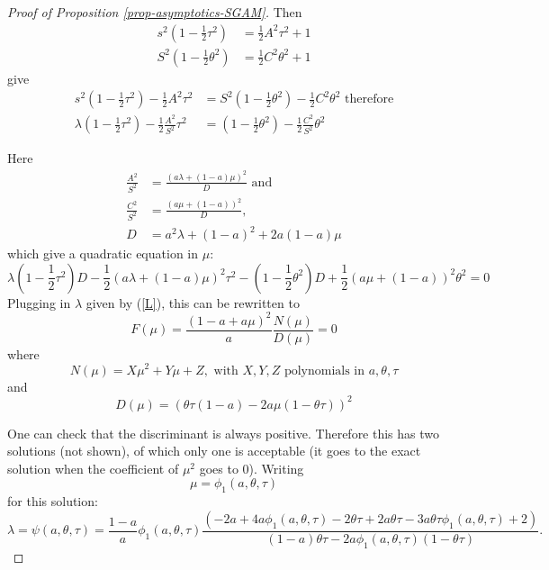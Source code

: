 \documentclass[
]{article}
\theoremstyle{definition}
\theoremstyle{definition}
\theoremstyle{definition}
\theoremstyle{definition}
\theoremstyle{remark}
\begin{document}
\begin{proof}[Proof of Proposition \ref{prop-asymptotics-SGAM}]
Then
\begin{align*}
s^{2}\left(1-\frac{1}{2}\tau^{2}\right) & =\frac{1}{2}A^{2}\tau^{2}+1\\
S^{2}\left(1-\frac{1}{2}\theta^{2}\right) & =\frac{1}{2}C^{2}\theta^{2}+1
\end{align*}
give
\begin{align*}
s^{2}\left(1-\frac{1}{2}\tau^{2}\right)-\frac{1}{2}A^{2}\tau^{2} & =S^{2}\left(1-\frac{1}{2}\theta^{2}\right)-\frac{1}{2}C^{2}\theta^{2}\text{ therefore}\\
\lambda\left(1-\frac{1}{2}\tau^{2}\right)-\frac{1}{2}\frac{A^{2}}{S^{2}}\tau^{2} & =\left(1-\frac{1}{2}\theta^{2}\right)-\frac{1}{2}\frac{C^{2}}{S^{2}}\theta^{2}
\end{align*}

Here
\begin{align*}
\frac{A^{2}}{S^{2}} & =\frac{\left(a\lambda+\left(1-a\right)\mu\right)^{2}}{D}\text{ \ and}\\
\frac{C^{2}}{S^{2}} & =\frac{\left(a\mu+\left(1-a\right)\right)^{2}}{D},\\
D & =a^{2}\lambda+\left(1-a\right)^{2}+2a\left(1-a\right)\mu
\end{align*}
which give a quadratic equation in $\mu$:
\[
\lambda\left(1-\frac{1}{2}\tau^{2}\right)D-\frac{1}{2}\left(a\lambda+\left(1-a\right)\mu\right)^{2}\tau^{2}-\left(1-\frac{1}{2}\theta^{2}\right)D+\frac{1}{2}\left(a\mu+\left(1-a\right)\right)^{2}\theta^{2}=0
\]
Plugging in $\lambda$ given by (\ref{L}), this can be rewritten
to
\[
F\left(\mu\right)=\frac{\left(1-a+a\mu\right)^{2}}{a}\frac{N\left(\mu\right)}{D\left(\mu\right)}=0
\]
where
\[
N\left(\mu\right)=X\mu^{2}+Y\mu+Z,\textrm{ with }X,Y,Z\textrm{ polynomials in }a,\theta,\tau
\]
and
\[
D\left(\mu\right)=\left(\theta\tau\left(1-a\right)-2a\mu\left(1-\theta\tau\right)\right)^{2}
\]

One can check that the discriminant is always positive. Therefore
this has two solutions (not shown), of which only one is acceptable
(it goes to the exact solution when the coefficient of $\mu^{2}$
goes to 0). Writing 
\[
\mu=\phi_{1}(a,\theta,\tau)
\]
 for this solution:
\[
\lambda=\psi\left(a,\theta,\tau\right)=\frac{1-a}{a}\phi_{1}\left(a,\theta,\tau\right)\allowbreak\frac{\left(-2a+4a\phi_{1}\left(a,\theta,\tau\right)-2\theta\tau+2a\theta\tau-3a\theta\tau\phi_{1}\left(a,\theta,\tau\right)+2\right)}{\left(1-a\right)\theta\tau-2a\phi_{1}\left(a,\theta,\tau\right)\left(1-\theta\tau\right)}.
\]


\end{proof}
\end{document}
